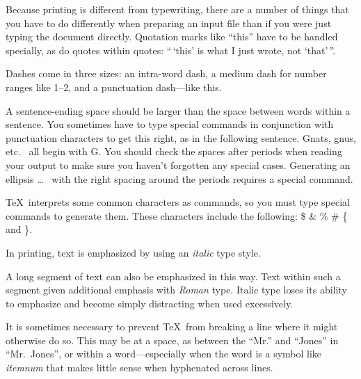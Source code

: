 Because printing is different from typewriting, there are a 
number of things that you have to do differently when preparing 
an input file than if you were just typing the document directly. 
Quotation marks like 
       ``this'' 
have to be handled specially, as do quotes within quotes: 
       ``\,`this' %
        is what I just 
        wrote, not  `that'\,''.

Dashes come in three sizes: an 
       intra-word 
dash, a medium dash for number ranges like 
       1--2, 
and a punctuation 
       dash---like 
this.

A sentence-ending space should be larger than the space between words 
within a sentence.  You sometimes have to type special commands in 
conjunction with punctuation characters to get this right, as in the 
following sentence. 
       Gnats, gnus, etc.\    %
       all begin with G\@.   %
You should check the spaces after periods when reading your output to 
make sure you haven't forgotten any special cases. 
Generating an ellipsis 
       \ldots\    %
with the right spacing around the periods 
requires a special  command.

\TeX\ interprets some common characters as commands, so you 
must type special commands to generate them.  These 
characters include the following: 
       \$ \& \% \# \{ and \}.

In printing, text is emphasized by using an %
       {\em italic\/}  %
type style.

\begin{em} 
   A long segment of text can also be emphasized in this way.  Text within 
   such a segment given additional emphasis 
          with\/ {\em Roman} 
   type.  Italic type loses its ability to emphasize and become simply 
   distracting when used excessively. 
\end{em}

It is sometimes necessary to prevent \TeX\ from breaking a line where 
it might otherwise do so.  This may be at a space, as between the 
``Mr.'' and ``Jones'' in 
       ``Mr.~Jones'',        %
or within a word---especially when the word is a symbol like 
       \mbox{\em itemnum\/} 
that makes little sense when hyphenated across 
       lines.

